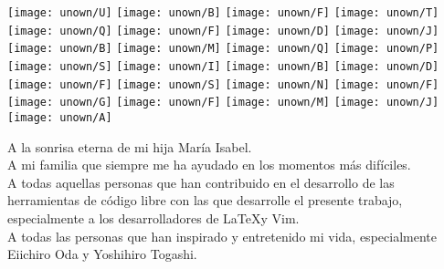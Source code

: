 {\texttt{[image: unown/U]}
\texttt{[image: unown/B]}
\texttt{[image: unown/F]}
\texttt{[image: unown/T]}
\texttt{[image: unown/Q]}
\texttt{[image: unown/F]}
\texttt{[image: unown/D]}
\texttt{[image: unown/J]}
\texttt{[image: unown/B]}
\texttt{[image: unown/M]}
\texttt{[image: unown/Q]}
\texttt{[image: unown/P]}
\texttt{[image: unown/S]}
\texttt{[image: unown/I]}
\texttt{[image: unown/B]}
\texttt{[image: unown/D]}
\texttt{[image: unown/F]}
\texttt{[image: unown/S]}
\texttt{[image: unown/N]}
\texttt{[image: unown/F]}
\texttt{[image: unown/G]}
\texttt{[image: unown/F]}
\texttt{[image: unown/M]}
\texttt{[image: unown/J]}
\texttt{[image: unown/A]}
}

\vspace{5cm}

\begin{flushright}%
\begin{minipage}{0.7\textwidth}%
        \begin{flushright}%
                {\noindent A la sonrisa eterna de mi hija María Isabel.\\
                A mi familia que siempre me ha ayudado en los momentos más difíciles.\\
                A todas aquellas personas que han contribuido en el desarrollo de las herramientas de código 
		libre con las que desarrolle el presente trabajo, especialmente a los desarrolladores de 
		\LaTeX y Vim.\\
                A todas las personas que han inspirado y entretenido mi vida, especialmente Eiichiro Oda y 
		Yoshihiro Togashi.\\}
        \end{flushright}
\end{minipage}
\end{flushright}

\vspace{3.5cm}
